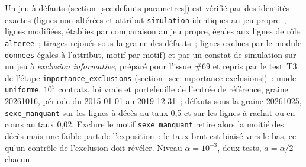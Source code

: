 \documentclass[a4paper,11pt]{article}
\newcommand{\code}[1]{\texttt{\small #1}}
\begin{document}
Un jeu à défauts (section~\ref{sec:defauts-parametres}) est vérifié par des
identités exactes (lignes non altérées et attribut \code{simulation}
identiques au jeu propre~; lignes modifiées, établies par comparaison au
jeu propre, égales aux lignes de rôle \code{alteree}~; tirages rejoués sous
la graine des défauts~; lignes exclues par le module \code{donnees} égales
à l'attribut, motif par motif) et par un constat de simulation sur un jeu à
\emph{exclusion informative}, préparé pour l'issue~\#69 et repris par le
test~T3 de l'étape \code{importance\_exclusions}
(section~\ref{sec:importance-exclusions})~: mode
\code{uniforme}, $10^{5}$ contrats, loi vraie et portefeuille de l'entrée de
référence, graine 20261016, période du 2015-01-01 au 2019-12-31~; défauts
sous la graine 20261025, \code{sexe\_manquant} sur les lignes à décès au
taux 0,5 et sur les lignes à rachat ou en cours au taux 0,02. Exclure le
motif \code{sexe\_manquant} retire alors la moitié des décès mais une faible
part de l'exposition~: le taux brut est biaisé vers le bas, ce qu'un
contrôle de l'exclusion doit révéler. Niveau $\alpha = 10^{-3}$, deux
tests, $a = \alpha/2$ chacun.
\end{document}
